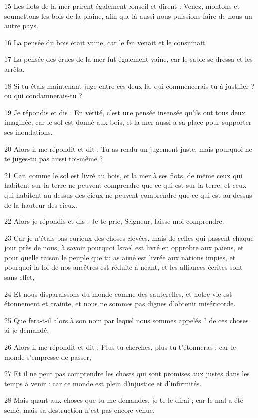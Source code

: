\par 15 Les flots de la mer prirent également conseil et dirent : Venez, montons et soumettons les bois de la plaine, afin que là aussi nous puissions faire de nous un autre pays.
\par 16 La pensée du bois était vaine, car le feu venait et le consumait.
\par 17 La pensée des crues de la mer fut également vaine, car le sable se dressa et les arrêta.
\par 18 Si tu étais maintenant juge entre ces deux-là, qui commencerais-tu à justifier ? ou qui condamnerais-tu ?
\par 19 Je répondis et dis : En vérité, c'est une pensée insensée qu'ils ont tous deux imaginée, car le sol est donné aux bois, et la mer aussi a sa place pour supporter ses inondations.
\par 20 Alors il me répondit et dit : Tu as rendu un jugement juste, mais pourquoi ne te juges-tu pas aussi toi-même ?
\par 21 Car, comme le sol est livré au bois, et la mer à ses flots, de même ceux qui habitent sur la terre ne peuvent comprendre que ce qui est sur la terre, et ceux qui habitent au-dessus des cieux ne peuvent comprendre que ce qui est au-dessus de la hauteur des cieux.
\par 22 Alors je répondis et dis : Je te prie, Seigneur, laisse-moi comprendre.
\par 23 Car je n'étais pas curieux des choses élevées, mais de celles qui passent chaque jour près de nous, à savoir pourquoi Israël est livré en opprobre aux païens, et pour quelle raison le peuple que tu as aimé est livrée aux nations impies, et pourquoi la loi de nos ancêtres est réduite à néant, et les alliances écrites sont sans effet,
\par 24 Et nous disparaissons du monde comme des sauterelles, et notre vie est étonnement et crainte, et nous ne sommes pas dignes d'obtenir miséricorde.
\par 25 Que fera-t-il alors à son nom par lequel nous sommes appelés ? de ces choses ai-je demandé.
\par 26 Alors il me répondit et dit : Plus tu cherches, plus tu t'étonneras ; car le monde s'empresse de passer,
\par 27 Et il ne peut pas comprendre les choses qui sont promises aux justes dans les temps à venir : car ce monde est plein d'injustice et d'infirmités.
\par 28 Mais quant aux choses que tu me demandes, je te le dirai ; car le mal a été semé, mais sa destruction n'est pas encore venue.
